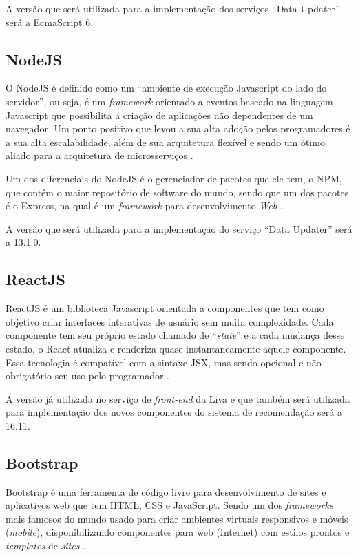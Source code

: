 A versão que será utilizada para a implementação dos serviços “Data Updater” será a EcmaScript 6.

\subsection{NodeJS}

O NodeJS é definido como um “ambiente de execução Javascript do lado do servidor”, ou seja, é um \textit{framework} orientado a eventos baseado na linguagem Javascript que possibilita a criação de aplicações não dependentes de um navegador. Um ponto positivo que levou a sua alta adoção pelos programadores é a sua alta escalabilidade, além de sua arquitetura flexível e sendo um ótimo aliado para a arquitetura de microsserviços \cite{nodejs:2019}.

Um dos diferenciais do NodeJS é o gerenciador de pacotes que ele tem, o NPM, que contém o maior repositório de software do mundo, sendo que um dos pacotes é o Express, na qual é um \textit{framework} para desenvolvimento \textit{Web} \cite{lenon:2018}.

A versão que será utilizada para a implementação do serviço “Data Updater” será a 13.1.0.

\subsection{ReactJS}

ReactJS é um biblioteca Javascript orientada a componentes que tem como objetivo criar interfaces interativas de usuário sem muita complexidade. Cada componente tem seu próprio estado chamado de “\textit{state}” e a cada mudança desse estado, o React atualiza e renderiza quase instantaneamente aquele componente. Essa tecnologia é compatível com a sintaxe JSX, mas sendo opcional e não obrigatório seu uso pelo programador \cite{reactjs:2019}.

A versão já utilizada no serviço de \textit{front-end} da Liva e que também será utilizada para implementação dos novos componentes do sistema de recomendação será a 16.11.

\subsection{Bootstrap}

Bootstrap é uma ferramenta de código livre para desenvolvimento de sites e aplicativos web que tem HTML, CSS e JavaScript. Sendo um dos \textit{frameworks} mais famosos do mundo usado para criar ambientes virtuais responsivos e móveis (\textit{mobile}), disponibilizando componentes para web (Internet) com estilos prontos e \textit{templates} de \textit{sites} \cite{bootstrap:2019}.

